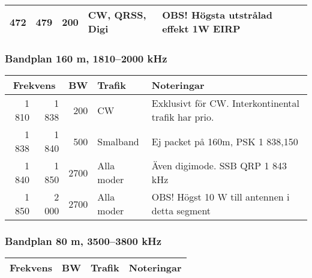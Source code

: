 \begin{landscape}
\begin{tabular}{rrrll}
472 & 479 & 200 & CW, QRSS, Digi & OBS! Högsta utstrålad effekt 1W EIRP \\ \hline
\end{tabular}

\subsubsection{Bandplan 160 m, 1810--2000 kHz}
\begin{tabular}{rrrll}
\multicolumn{2}{c}{\textbf{Frekvens}} & \textbf{BW} & \textbf{Trafik} & \textbf{Noteringar} \\ \hline

1 810 & 1 838 & 200  & CW         & Exklusivt för CW. Interkontinental trafik har prio. \\ \hline
1 838 & 1 840 & 500  & Smalband   & Ej packet på 160m, PSK 1 838,150                    \\ \hline
1 840 & 1 850 & 2700 & Alla moder & Även digimode. SSB QRP 1 843 kHz                    \\ \hline
1 850 & 2 000 & 2700 & Alla moder & OBS! Högst 10 W till antennen i detta segment       \\ \hline
\end{tabular}


\subsubsection{Bandplan 80 m, 3500--3800 kHz}
\begin{tabular}{rrrll}
\multicolumn{2}{c}{\textbf{Frekvens}} & \textbf{BW} & \textbf{Trafik} & \textbf{Noteringar} \\ \hline


\end{tabular}
\end{landscape}
